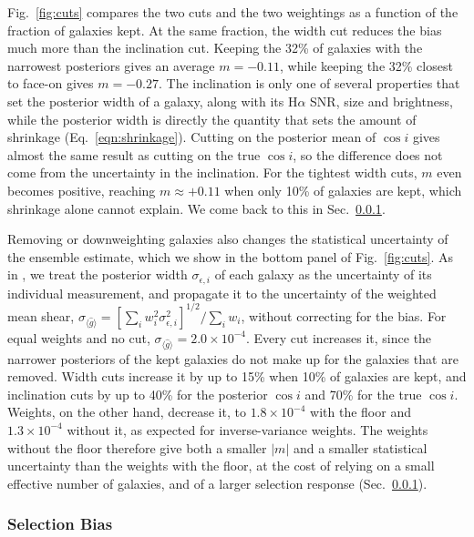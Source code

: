 Fig.~\ref{fig:cuts} compares the two cuts and the two weightings as a function of the fraction of galaxies kept. At the same fraction, the width cut reduces the bias much more than the inclination cut. Keeping the 32\% of galaxies with the narrowest posteriors gives an average $m = -0.11$, while keeping the 32\% closest to face-on gives $m = -0.27$. The inclination is only one of several properties that set the posterior width of a galaxy, along with its H$\alpha$ SNR, size and brightness, while the posterior width is directly the quantity that sets the amount of shrinkage (Eq.~\ref{eqn:shrinkage}). Cutting on the posterior mean of $\cos i$ gives almost the same result as cutting on the true $\cos i$, so the difference does not come from the uncertainty in the inclination. For the tightest width cuts, $m$ even becomes positive, reaching $m \approx +0.11$ when only 10\% of galaxies are kept, which shrinkage alone cannot explain. We come back to this in Sec.~\ref{sssec:selection}.

Removing or downweighting galaxies also changes the statistical uncertainty of the ensemble estimate, which we show in the bottom panel of Fig.~\ref{fig:cuts}. As in \citep{KLInferenceI}, we treat the posterior width $\sigma_{\epsilon,i}$ of each galaxy as the uncertainty of its individual measurement, and propagate it to the uncertainty of the weighted mean shear, $\sigma_{\langle\hat{g}\rangle} = [\sum_i w_i^2 \sigma_{\epsilon,i}^2]^{1/2}/\sum_i w_i$, without correcting for the bias. For equal weights and no cut, $\sigma_{\langle\hat{g}\rangle} = 2.0\times10^{-4}$. Every cut increases it, since the narrower posteriors of the kept galaxies do not make up for the galaxies that are removed. Width cuts increase it by up to 15\% when 10\% of galaxies are kept, and inclination cuts by up to 40\% for the posterior $\cos i$ and 70\% for the true $\cos i$. Weights, on the other hand, decrease it, to $1.8\times10^{-4}$ with the floor and $1.3\times10^{-4}$ without it, as expected for inverse-variance weights. The weights without the floor therefore give both a smaller $|m|$ and a smaller statistical uncertainty than the weights with the floor, at the cost of relying on a small effective number of galaxies, and of a larger selection response (Sec.~\ref{sssec:selection}). 

\subsubsection{Selection Bias}
\label{sssec:selection}

